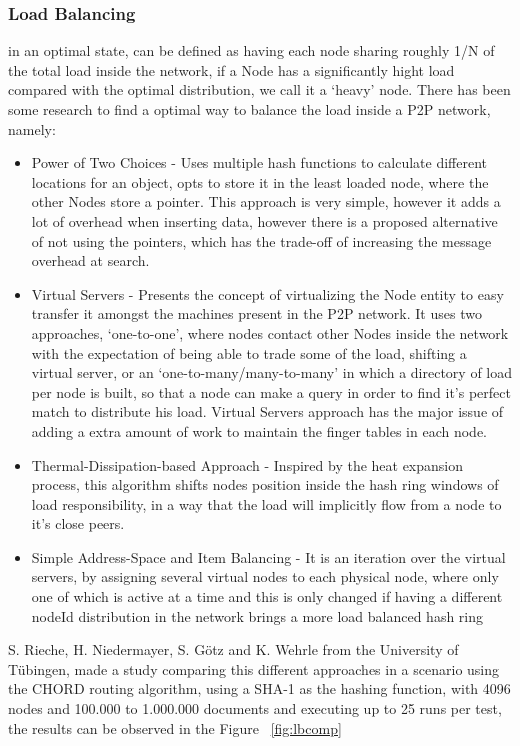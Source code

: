 \subsubsection{Load Balancing}\label{par:load_balancing}

in an optimal state, can be defined as having each node sharing roughly 1/N of the total load inside the network, if a Node has a significantly hight load compared with the optimal distribution, we call it a `heavy' node. There has been some research to find a optimal way to balance the load inside a P2P network, namely:

\begin{itemize}
   \item Power of Two Choices\cite{Byers} - Uses multiple hash functions to calculate different locations for an object, opts to store it in the least loaded node, where the other Nodes store a pointer. This approach is very simple, however it adds a lot of overhead when inserting data, however there is a proposed alternative of not using the pointers, which has the trade-off of increasing the message overhead at search.
   \item Virtual Servers\cite{Rao2003} - Presents the concept of virtualizing the Node entity to easy transfer it amongst the machines present in the P2P network. It uses two approaches, `one-to-one', where nodes contact other Nodes inside the network with the expectation of being able to trade some of the load, shifting a virtual server, or an `one-to-many/many-to-many' in which a directory of load per node is built, so that a node can make a query in order to find it's perfect match to distribute his load. Virtual Servers approach has the major issue of adding a extra amount of work to maintain the finger tables in each node.
   \item Thermal-Dissipation-based Approach\cite{Rieche} - Inspired by the heat expansion process, this algorithm shifts nodes position inside the hash ring windows of load responsibility, in a way that the load will implicitly flow from a node to it's close peers.
   \item Simple Address-Space and Item Balancing\cite{Karger2004} - It is an iteration over the virtual servers, by assigning several virtual nodes to each physical node, where only one of which is active at a time and this is only changed if having a different nodeId distribution in the network brings a more load balanced hash ring
 \end{itemize} 

S. Rieche, H. Niedermayer, S. Götz and  K. Wehrle from the University of Tübingen, made a study comparing this different approaches in a scenario using the CHORD routing algorithm, using a SHA-1 as the hashing function, with 4096 nodes and 100.000 to 1.000.000 documents and executing up to 25 runs per test, the results can be observed in the Figure ~\ref{fig:lbcomp}

